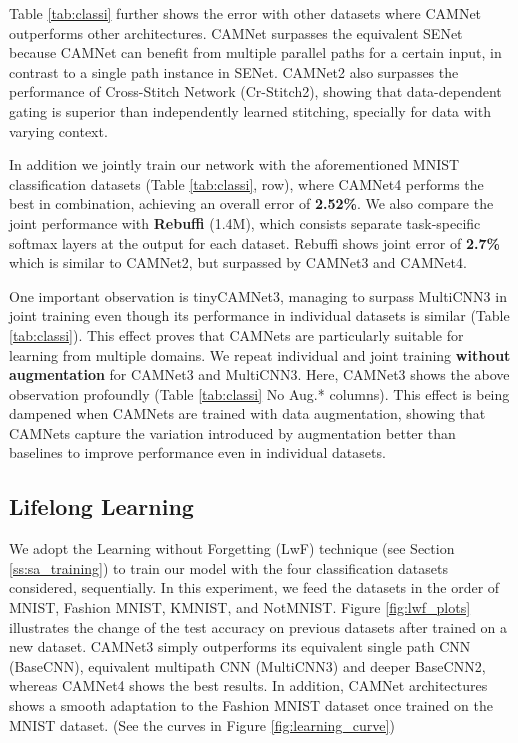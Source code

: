 \documentclass[10pt,twocolumn,letterpaper]{article}
\begin{document}
Table \ref{tab:classi} further shows the error with other datasets where CAMNet outperforms other architectures. CAMNet surpasses the equivalent SENet because CAMNet can benefit from multiple parallel paths for a certain input, in contrast to a single path instance in SENet. CAMNet2 also surpasses the performance of Cross-Stitch Network (Cr-Stitch2), showing that data-dependent gating is superior than independently learned stitching, specially for data with varying context. 

In addition we jointly train our network with the aforementioned MNIST classification datasets (Table \ref{tab:classi},  row), where CAMNet4 performs the best in combination, achieving an overall error of \textbf{2.52\%}. We also compare the joint performance with \textbf{Rebuffi \etal} \cite{residual-adapters} (1.4M), which consists separate task-specific softmax layers at the output for each dataset. Rebuffi \etal shows joint error of \textbf{2.7\%} which is similar to CAMNet2, but surpassed by CAMNet3 and CAMNet4.

One important observation is tinyCAMNet3, managing to surpass MultiCNN3 in joint training even though its performance in individual datasets is similar (Table \ref{tab:classi}). This effect proves that CAMNets are particularly suitable for learning from multiple domains. We repeat individual and joint training \textbf{without augmentation} for CAMNet3 and MultiCNN3. Here, CAMNet3 shows the above observation profoundly (Table \ref{tab:classi} No Aug.* columns). This effect is being dampened when CAMNets are trained with data augmentation, showing that CAMNets capture the variation introduced by augmentation better than baselines to improve performance even in individual datasets.





\subsection{Lifelong Learning}
\label{ss:seq_mul}
\vspace{-0.05in}

We adopt the Learning without Forgetting (LwF) technique (see Section \ref{ss:sa_training}) to train our model with the four classification datasets considered, sequentially. In this experiment, we feed the datasets in the order of MNIST, Fashion MNIST, KMNIST, and NotMNIST. Figure \ref{fig:lwf_plots} illustrates the change of the test accuracy on previous datasets after trained on a new dataset. CAMNet3 simply outperforms its equivalent single path CNN (BaseCNN), equivalent multipath CNN (MultiCNN3) and deeper BaseCNN2, whereas CAMNet4 shows the best results. In addition, CAMNet architectures shows a smooth adaptation to the Fashion MNIST dataset once trained on the MNIST dataset. (See the curves in Figure \ref{fig:learning_curve})
\end{document}
